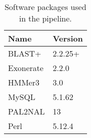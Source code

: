 \begin{table}
\centering
\begin{tabular}{l l}
Name       & Version\\
\hline
BLAST+     & 2.2.25+\\
Exonerate  & 2.2.0\\
HMMer3     & 3.0\\
MySQL      & 5.1.62\\
PAL2NAL    & 13\\
Perl       & 5.12.4\\
\hline
\end{tabular}
\caption{Software packages used in the pipeline.}
\label{tab:software}
\end{table}
